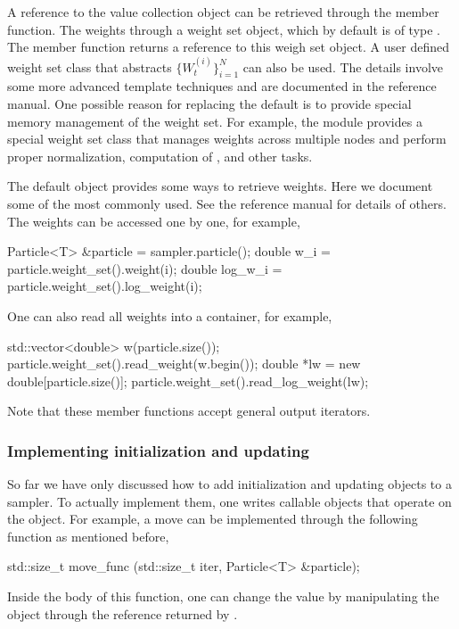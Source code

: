 A reference to the value collection  object can be retrieved
through the  member function. The weights
through a weight set object, which by default is of type
. The  member function
returns a reference to this weigh set object. A user defined weight set class
that abstracts $\{W_t^{(i)}\}_{i=1}^N$ can also be used. The details involve
some more advanced \cpp template techniques and are documented in the
reference manual. One possible reason for replacing the default is to provide
special memory management of the weight set. For example, the \mpi module
provides a special weight set class that manages weights across multiple nodes
and perform proper normalization, computation of \ess, and other tasks.

The default  object provides some ways to retrieve
weights. Here we document some of the most commonly used. See the reference
manual for details of others. The weights can be accessed one by one, for
example,
\begin{cppcode}
Particle<T> &particle = sampler.particle();
double w_i     = particle.weight_set().weight(i);
double log_w_i = particle.weight_set().log_weight(i);
\end{cppcode}
One can also read all weights into a container, for example,
\begin{cppcode}
std::vector<double> w(particle.size());
particle.weight_set().read_weight(w.begin());
double *lw = new double[particle.size()];
particle.weight_set().read_log_weight(lw);
\end{cppcode}
Note that these member functions accept general output iterators.

\subsubsection{Implementing initialization and updating}
\label{ssub:Implementing initialization and updating}

So far we have only discussed how to add initialization and updating objects
to a sampler. To actually implement them, one writes callable objects that
operate on the  object. For example, a move can be
implemented through the following function as mentioned before,
\begin{cppcode}
std::size_t move_func (std::size_t iter, Particle<T> &particle);
\end{cppcode}
Inside the body of this function, one can change the value by manipulating the
object through the reference returned by .

